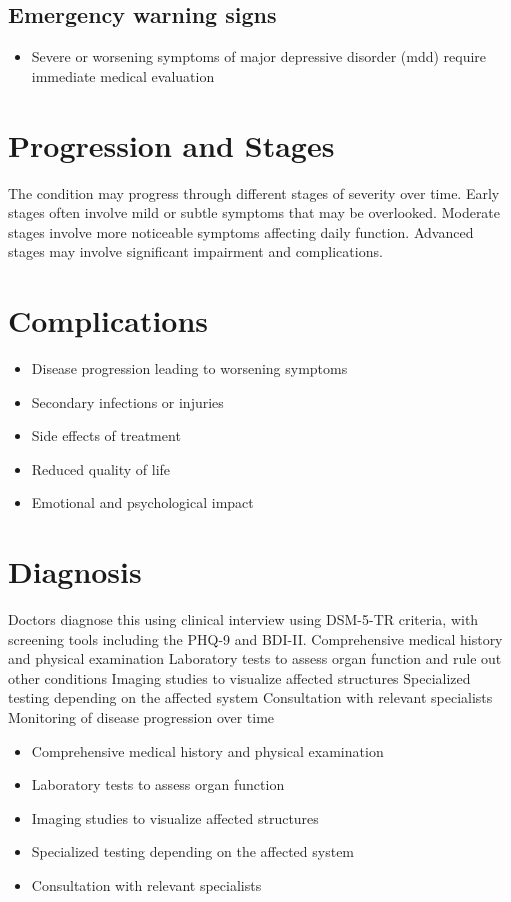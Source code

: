 \subsection{Emergency warning signs}
\begin{itemize}[noitemsep]
  \item Severe or worsening symptoms of major depressive disorder (mdd) require immediate medical evaluation
\end{itemize}
\section{Progression and Stages}
The condition may progress through different stages of severity over time. Early stages often involve mild or subtle symptoms that may be overlooked. Moderate stages involve more noticeable symptoms affecting daily function. Advanced stages may involve significant impairment and complications.
\section{Complications}
\begin{itemize}[noitemsep]
  \item Disease progression leading to worsening symptoms
  \item Secondary infections or injuries
  \item Side effects of treatment
  \item Reduced quality of life
  \item Emotional and psychological impact
\end{itemize}
\section{Diagnosis}
Doctors diagnose this using clinical interview using DSM-5-TR criteria, with screening tools including the PHQ-9 and BDI-II. Comprehensive medical history and physical examination Laboratory tests to assess organ function and rule out other conditions Imaging studies to visualize affected structures Specialized testing depending on the affected system Consultation with relevant specialists Monitoring of disease progression over time

\begin{itemize}[noitemsep]
  \item Comprehensive medical history and physical examination
  \item Laboratory tests to assess organ function
  \item Imaging studies to visualize affected structures
  \item Specialized testing depending on the affected system
  \item Consultation with relevant specialists
\end{itemize}
